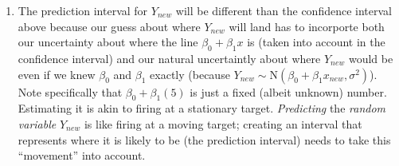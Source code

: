 {\begin{enumerate}
      \[ (x_{new} - \bar{x})^2 = (5 - 5)^2 = 0 \]
      Since $\hat{Y}_{new}$ is a function of $\hat{\beta}_0$ and $\hat{\beta}_1$, it should be no surprise that we need to estimate its variance as well. The estimated variance of $\hat{Y}_{new}$ is:
      \begin{eqnarray*}
        s_{\hat{Y}}^2 &=& \frac{1}{n - 2} \text{SSE} \left[ \frac{1}{n} + \frac{(x_{new} - \bar{x})^2}{\sum_i (x_i - \bar{x})^2} \right]\\
        &=& \frac{1}{n - 2} \text{SSE} \left( \frac{1}{n} \right)\\
        &=& \frac{\hat{\sigma}^2}{6}\\
        &=& 0.042
      \end{eqnarray*}
      Now we make a confidence interval using:
      \begin{eqnarray*}
        \hat{Y}_{new} \pm t_{4, 0.975} \sqrt{s^2_{\hat{Y}}} &=& \hat{\beta}_0 + \hat{\beta}_1(5) \pm (2.776) \sqrt{0.042}\\
        &=& -0.169 + 5(1.0504) \pm 2.776(0.205)\\
        &=& (4.514, 5.652)
      \end{eqnarray*}
    \item The prediction interval for $Y_{new}$ will be different than the confidence interval above because our guess about where $Y_{new}$ will land has to incorporte both our uncertainty about where the line $\beta_0 + \beta_1 x$ is (taken into account in the confidence interval) and our natural uncertaintly about where $Y_{new}$ would be even if we knew $\beta_0$ and $\beta_1$ exactly (because $Y_{new} \sim \text{N}(\beta_0 + \beta_1 x_{new}, \sigma^2)$).\\

      Note specifically that $\beta_0 + \beta_1 (5)$ is just a fixed (albeit unknown) number. Estimating it is akin to firing at a stationary target. \emph{Predicting} the \emph{random variable} $Y_{new}$ is like firing at a moving target; creating an interval that represents where it is likely to be (the prediction interval) needs to take this ``movement'' into account.\\


\end{enumerate}}
